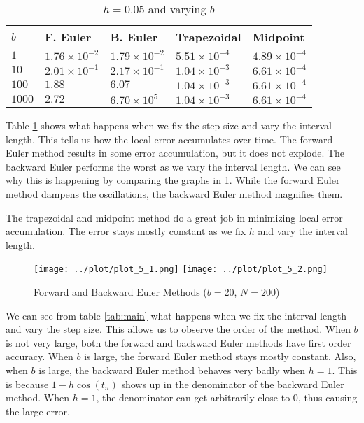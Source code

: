 \begin{solution}
  \begin{table}[!ht]
    \centering
    \caption{$h = 0.05$ and varying $b$}
    \label{tab:vary_b}
    \begin{tabular}{|lllll|}
      \hline
      $b$    & F. Euler    & B. Euler       & Trapezoidal & Midpoint \\
      \hline   
      $1$    & $1.76 \times 10^{-2}$ & $1.79 \times 10^{-2}$   & $5.51 \times 10^{-4}$ & $4.89 \times 10^{-4}$ \\
      $10$   & $2.01 \times 10^{-1}$ & $2.17 \times 10^{-1}$   & $1.04 \times 10^{-3}$ & $6.61 \times 10^{-4}$ \\
      $100$  & $1.88$                & $6.07$                  & $1.04 \times 10^{-3}$ & $6.61 \times 10^{-4}$ \\
      $1000$ & $2.72$                & $6.70 \times 10^{5}$    & $1.04 \times 10^{-3}$ & $6.61 \times 10^{-4}$ \\
      \hline
    \end{tabular}
  \end{table}
  
  Table \ref{tab:vary_b} shows what happens when we fix the step size and vary the interval length. This tells us how the local error accumulates over time. The forward Euler method results in some error accumulation, but it does not explode. The backward Euler performs the worst as we vary the interval length. We can see why this is happening by comparing the graphs in \ref{fig:fb}. While the forward Euler method dampens the oscillations, the backward Euler method magnifies them.
  
  The trapezoidal and midpoint method do a great job in minimizing local error accumulation. The error stays mostly constant as we fix $h$ and vary the interval length.
  
  \begin{figure}[!ht]
    \centering
    \texttt{[image: ../plot/plot\_5\_1.png]}
    \texttt{[image: ../plot/plot\_5\_2.png]}
    \caption{Forward and Backward Euler Methods ($b=20$, $N=200$)}
    \label{fig:fb}
  \end{figure}
  
  We can see from table \ref{tab:main} what happens when we fix the interval length and vary the step size. This allows us to observe the order of the method. When $b$ is not very large, both the forward and backward Euler methods have first order accuracy. When $b$ is large, the forward Euler method stays mostly constant. Also, when $b$ is large, the backward Euler method behaves very badly when $h = 1$. This is because $1 - h \cos(t_n)$ shows up in the denominator of the backward Euler method. When $h = 1$, the denominator can get arbitrarily close to $0$, thus causing the large error.
  

\end{solution}
